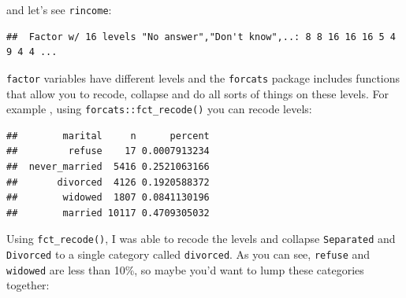 \documentclass[]{gitbook}
\newenvironment{Shaded}{\begin{snugshade}}{\end{snugshade}}
\newcommand{\DataTypeTok}[1]{\textcolor[rgb]{0.13,0.29,0.53}{#1}}
\newcommand{\KeywordTok}[1]{\textcolor[rgb]{0.13,0.29,0.53}{\textbf{#1}}}
\newcommand{\NormalTok}[1]{#1}
\newcommand{\OperatorTok}[1]{\textcolor[rgb]{0.81,0.36,0.00}{\textbf{#1}}}
\newcommand{\StringTok}[1]{\textcolor[rgb]{0.31,0.60,0.02}{#1}}
\begin{document}
and let's see \texttt{rincome}:

\begin{Shaded}
\end{Shaded}

\begin{verbatim}
##  Factor w/ 16 levels "No answer","Don't know",..: 8 8 16 16 16 5 4 9 4 4 ...
\end{verbatim}

\texttt{factor} variables have different levels and the \texttt{forcats} package includes functions that allow
you to recode, collapse and do all sorts of things on these levels. For example , using
\texttt{forcats::fct\_recode()} you can recode levels:

\begin{Shaded}
\end{Shaded}

\begin{verbatim}
##        marital     n      percent
##         refuse    17 0.0007913234
##  never_married  5416 0.2521063166
##       divorced  4126 0.1920588372
##        widowed  1807 0.0841130196
##        married 10117 0.4709305032
\end{verbatim}

Using \texttt{fct\_recode()}, I was able to recode the levels and collapse \texttt{Separated} and \texttt{Divorced} to
a single category called \texttt{divorced}. As you can see, \texttt{refuse} and \texttt{widowed} are less than 10\%, so
maybe you'd want to lump these categories together:
\end{document}
